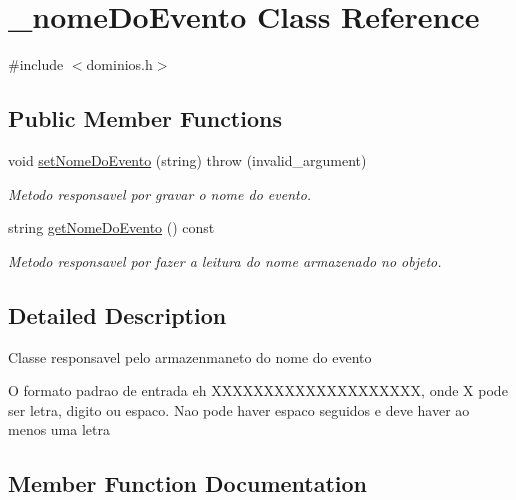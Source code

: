 \hypertarget{class__nome_do_evento}{}\section{\+\_\+nome\+Do\+Evento Class Reference}
\label{class__nome_do_evento}


{\ttfamily \#include $<$dominios.\+h$>$}

\subsection*{Public Member Functions}
\begin{DoxyCompactItemize}
\item 
void \mbox{\hyperlink{class__nome_do_evento_a30bf17a8e762fa948df7efd22c4e8450}{set\+Nome\+Do\+Evento}} (string)  throw (invalid\+\_\+argument)
\begin{DoxyCompactList}\small\item\em Metodo responsavel por gravar o nome do evento. \end{DoxyCompactList}\item 
string \mbox{\hyperlink{class__nome_do_evento_ac66ec981639b93171c6a661dc3b00461}{get\+Nome\+Do\+Evento}} () const
\begin{DoxyCompactList}\small\item\em Metodo responsavel por fazer a leitura do nome armazenado no objeto. \end{DoxyCompactList}\end{DoxyCompactItemize}


\subsection{Detailed Description}
Classe responsavel pelo armazenmaneto do nome do evento

O formato padrao de entrada eh X\+X\+X\+X\+X\+X\+X\+X\+X\+X\+X\+X\+X\+X\+X\+X\+X\+X\+XX, onde X pode ser letra, digito ou espaco. Nao pode haver espaco seguidos e deve haver ao menos uma letra 

\subsection{Member Function Documentation}
\mbox{\label{class__nome_do_evento_ac66ec981639b93171c6a661dc3b00461}} 
